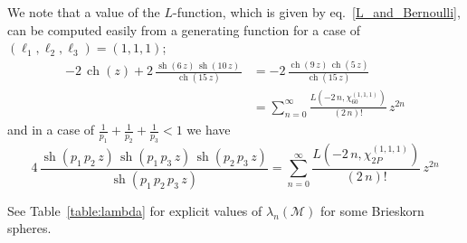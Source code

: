 \documentclass[12pt,reqno]{amsart}
\numberwithin{equation}{section}
\DeclareMathOperator{\sh}{sh}
\DeclareMathOperator{\ch}{ch}
\begin{document}
We note that
a value of the $L$-function, which is given by eq.~\eqref{L_and_Bernoulli},
can be computed easily from a generating function for  a case of
$(\ell_1,\ell_2,\ell_3)=(1,1,1)$;
\begin{align}
  -2 \, \ch (z)
  +
  2 \,
  \frac{
    \sh ( 6 \, z) \,
    \sh ( 10 \, z) \,
    }{
      \ch ( 15 \, z)
    }
    & =
    - 2 \,
    \frac{\ch (9 \, z) \, \ch(5 \, z)}{
      \ch(15 \, z)
    }
    \nonumber
    \\
    & =
    \sum_{n=0}^\infty
    \frac{
      L(-2 \, n , \chi_{60}^{(1,1,1)})
    }{(2 \, n)!} \,
    z^{2 n}
  \end{align}
and in a case of
$
\frac{1}{p_1} +     \frac{1}{p_2}+     \frac{1}{p_3} <1
$ we have
\begin{equation}
  \label{generating_Sigma}
  4 \,
  \frac{
    \sh ( p_1 \, p_2 \, z) \,
    \sh ( p_1 \, p_3 \, z) \,
    \sh ( p_2 \, p_3 \, z) 
    }{
      \sh ( p_1 \, p_2 \, p_3 \, z)
    }
    =
    \sum_{n=0}^\infty
    \frac{
      L(-2 \, n , \chi_{2 P}^{(1,1,1)})
    }{(2 \, n)!} \,
    z^{2 n}
\end{equation}

See Table~\ref{table:lambda} for explicit values of
$\lambda_n(\mathcal{M})$ for some Brieskorn spheres.
\end{document}
